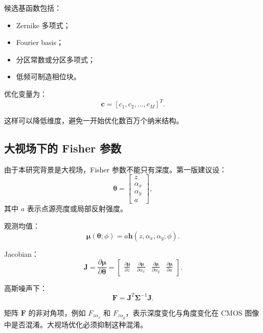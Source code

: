 \documentclass[11pt,a4paper,fontset=none]{ctexart}
\begin{document}
候选基函数包括：
\begin{itemize}
  \item Zernike 多项式；
  \item Fourier basis；
  \item 分区常数或分区多项式；
  \item 低频可制造相位块。
\end{itemize}

优化变量为：
\begin{equation}
  \bm c=[c_1,c_2,\ldots,c_M]^T.
\end{equation}

这样可以降低维度，避免一开始优化数百万个纳米结构。

\subsection{大视场下的 Fisher 参数}

由于本研究背景是大视场，Fisher 参数不能只有深度。第一版建议设：
\begin{equation}
  \bm\theta=
  \begin{bmatrix}
  z\\
  \alpha_x\\
  \alpha_y\\
  a
  \end{bmatrix},
\end{equation}
其中 $a$ 表示点源亮度或局部反射强度。

观测均值：
\begin{equation}
  \bm\mu(\bm\theta;\phi)
  =
  a\bm h(z,\alpha_x,\alpha_y;\phi).
\end{equation}

Jacobian：
\begin{equation}
  \bm J=
  \frac{\partial\bm\mu}{\partial\bm\theta}
  =
  \begin{bmatrix}
  \frac{\partial\bm\mu}{\partial z}&
  \frac{\partial\bm\mu}{\partial\alpha_x}&
  \frac{\partial\bm\mu}{\partial\alpha_y}&
  \frac{\partial\bm\mu}{\partial a}
  \end{bmatrix}.
\end{equation}

高斯噪声下：
\begin{equation}
  \bm F=
  \bm J^T\bm\Sigma^{-1}\bm J.
\end{equation}

矩阵 $\bm F$ 的非对角项，例如 $F_{z\alpha_x}$ 和 $F_{z\alpha_y}$，表示深度变化与角度变化在 CMOS 图像中是否混淆。大视场优化必须抑制这种混淆。
\end{document}
